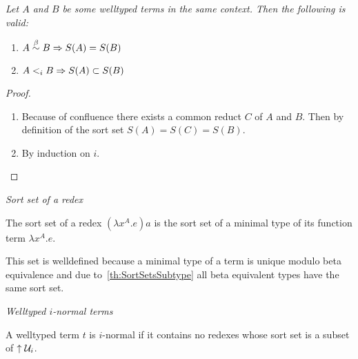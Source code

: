 \begin{theorem}
    \label{th:SortSetsSubtype}
    \emph{Let $A$ and $B$ be some welltyped terms in the same context. Then the
    following is valid:}
    \begin{enumerate}

        \item $A \stackrel{\beta}{\sim} B \Rightarrow S(A) = S(B)$

        \item $A <_i B \Rightarrow S(A) \subset S(B)$
    \end{enumerate}
    \begin{proof}

        \ \begin{enumerate}

            \item Because of confluence there exists a common reduct $C$ of $A$
                and $B$. Then by definition of the sort set $S(A) = S(C) =
                S(B)$.

            \item By induction on $i$.
        \end{enumerate}
    \end{proof}
\end{theorem}






\begin{definition}
    \label{def:RedexSortSet}
    \emph{Sort set of a redex}

    The sort set of a redex $(\lambda x^A. e) a$ is the sort set of a
    minimal type of its function term $\lambda x^A. e$.

    This set is welldefined because a minimal type of a term is unique modulo
    beta equivalence and due to~\ref{th:SortSetsSubtype} all beta equivalent
    types have the same sort set.
\end{definition}




\begin{definition}
    \label{def:INormalTerm}
    \emph{Welltyped $i$-normal terms}

    A welltyped term $t$ is $i$-normal if it contains no redexes whose sort set
    is a subset of ${\uparrow {\cal U}_i}$.
\end{definition}






